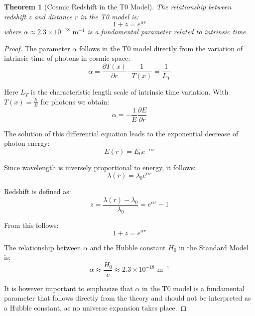 \documentclass{article}
\newtheorem{theorem}{Theorem}[section]
\theoremstyle{definition}
\theoremstyle{remark}
\newcommand{\Tfield}{T(x)} %
\begin{document}
	\begin{theorem}[Cosmic Redshift in the T0 Model]
		The relationship between redshift $z$ and distance $r$ in the T0 model is:
		\begin{equation}
			1 + z = e^{\alpha r}
		\end{equation}
		where $\alpha \approx 2.3 \times 10^{-18} \text{ m}^{-1}$ is a fundamental parameter related to intrinsic time.
	\end{theorem}
	
	\begin{proof}
		The parameter $\alpha$ follows in the T0 model directly from the variation of intrinsic time of photons in cosmic space:
		\begin{equation}
			\alpha = \frac{\partial \Tfield}{\partial r} \cdot \frac{1}{\Tfield} = \frac{1}{L_T}
		\end{equation}
		
		Here $L_T$ is the characteristic length scale of intrinsic time variation. With $\Tfield = \frac{\hbar}{E}$ for photons we obtain:
		\begin{equation}
			\alpha = -\frac{1}{E}\frac{\partial E}{\partial r}
		\end{equation}
		
		The solution of this differential equation leads to the exponential decrease of photon energy:
		\begin{equation}
			E(r) = E_0 e^{-\alpha r}
		\end{equation}
		
		Since wavelength is inversely proportional to energy, it follows:
		\begin{equation}
			\lambda(r) = \lambda_0 e^{\alpha r}
		\end{equation}
		
		Redshift is defined as:
		\begin{equation}
			z = \frac{\lambda(r) - \lambda_0}{\lambda_0} = e^{\alpha r} - 1
		\end{equation}
		
		From this follows:
		\begin{equation}
			1 + z = e^{\alpha r}
		\end{equation}
		
		The relationship between $\alpha$ and the Hubble constant $H_0$ in the Standard Model is:
		\begin{equation}
			\alpha \approx \frac{H_0}{c} \approx 2.3 \times 10^{-18} \text{ m}^{-1}
		\end{equation}
		
		It is however important to emphasize that $\alpha$ in the T0 model is a fundamental parameter that follows directly from the theory and should not be interpreted as a Hubble constant, as no universe expansion takes place.
	\end{proof}
	
\end{document}
